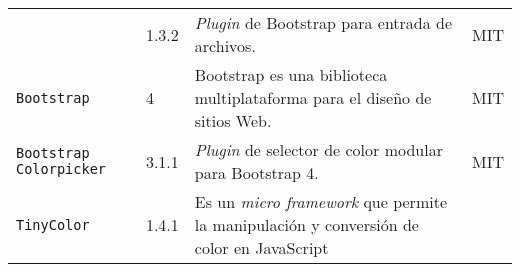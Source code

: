 \begin{longtable}[]{@{}llll@{}}
\begin{minipage}[t]{0.18\columnwidth}
\end{minipage} & \begin{minipage}[t]{0.08\columnwidth}\raggedright\strut
1.3.2\strut
\end{minipage} & \begin{minipage}[t]{0.49\columnwidth}\raggedright\strut
\emph{Plugin} de Bootstrap para entrada de archivos.\strut
\end{minipage} & \begin{minipage}[t]{0.11\columnwidth}\raggedright\strut
MIT\strut
\end{minipage}\tabularnewline
\begin{minipage}[t]{0.18\columnwidth}\raggedright\strut
\texttt{Bootstrap}\strut
\end{minipage} & \begin{minipage}[t]{0.08\columnwidth}\raggedright\strut
4\strut
\end{minipage} & \begin{minipage}[t]{0.49\columnwidth}\raggedright\strut
Bootstrap es una biblioteca multiplataforma para el diseño de sitios Web.\strut
\end{minipage} & \begin{minipage}[t]{0.11\columnwidth}\raggedright\strut
MIT\strut
\end{minipage}\tabularnewline
\begin{minipage}[t]{0.18\columnwidth}\raggedright\strut
\texttt{Bootstrap Colorpicker}\strut
\end{minipage} & \begin{minipage}[t]{0.08\columnwidth}\raggedright\strut
3.1.1\strut
\end{minipage} & \begin{minipage}[t]{0.49\columnwidth}\raggedright\strut
\emph{Plugin} de selector de color modular para Bootstrap 4.\strut
\end{minipage} & \begin{minipage}[t]{0.11\columnwidth}\raggedright\strut
MIT\strut
\end{minipage}\tabularnewline
\begin{minipage}[t]{0.18\columnwidth}\raggedright\strut
\texttt{TinyColor}\strut
\end{minipage} & \begin{minipage}[t]{0.08\columnwidth}\raggedright\strut
1.4.1\strut
\end{minipage} & \begin{minipage}[t]{0.49\columnwidth}\raggedright\strut
Es un \emph{micro framework} que permite la manipulación y conversión de color en JavaScript\strut

\end{minipage}
\end{longtable}
